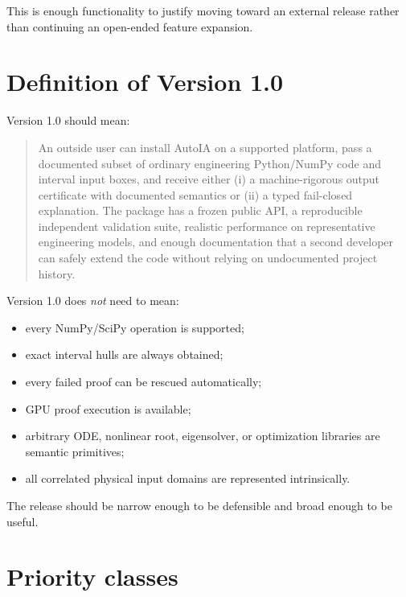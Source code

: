 \documentclass[11pt]{article}
\begin{document}
This is enough functionality to justify moving toward an external release rather
than continuing an open-ended feature expansion.

\section{Definition of Version 1.0}

Version 1.0 should mean:

\begin{quote}
An outside user can install AutoIA on a supported platform, pass a documented
subset of ordinary engineering Python/NumPy code and interval input boxes, and
receive either (i) a machine-rigorous output certificate with documented
semantics or (ii) a typed fail-closed explanation.  The package has a frozen
public API, a reproducible independent validation suite, realistic performance
on representative engineering models, and enough documentation that a second
developer can safely extend the code without relying on undocumented project
history.
\end{quote}

Version 1.0 does \emph{not} need to mean:
\begin{itemize}[leftmargin=*]
\item every NumPy/SciPy operation is supported;
\item exact interval hulls are always obtained;
\item every failed proof can be rescued automatically;
\item GPU proof execution is available;
\item arbitrary ODE, nonlinear root, eigensolver, or optimization libraries are
semantic primitives;
\item all correlated physical input domains are represented intrinsically.
\end{itemize}

The release should be narrow enough to be defensible and broad enough to be
useful.

\section{Priority classes}
\end{document}
